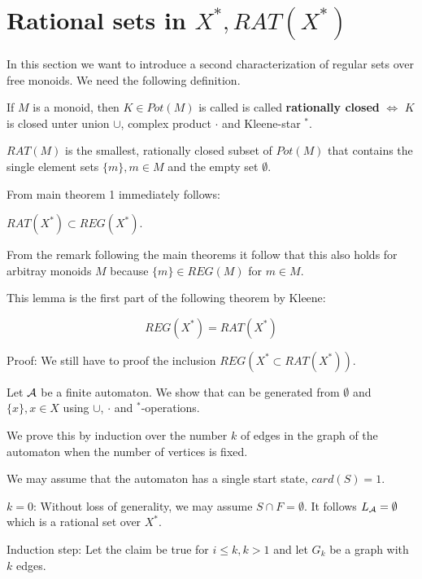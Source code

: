 \section{Rational sets in $X^*, RAT(X^*)$}

In this section we want to introduce a second characterization of regular sets
over free monoids. We need the following definition.

\begin{definition}
If $M$ is a monoid, then $K \in Pot(M)$ is called is called {\bf rationally
closed} $\Leftrightarrow$ $K$ is closed unter union $\cup$, complex product $\cdot$ and Kleene-star $^*$.
\end{definition}

\begin{definition}
$RAT(M)$ is the smallest, rationally closed subset of $Pot(M)$ that contains the
single element sets $\{m\}, m \in M$ and the empty set $\emptyset$.
\end{definition}

From main theorem 1 immediately follows:

\begin{lemma}
$RAT(X^*) \subset REG(X^*)$.
\end{lemma}

From the remark following the main theorems it follow that this also holds for
arbitray monoids $M$ because $\{m\} \in REG(M)$ for $m \in M$.

This lemma is the first part of the following theorem by Kleene:

\begin{theorem}[Kleene]
\[ REG(X^*) = RAT(X^*) \]
\end{theorem}

Proof: We still have to proof the inclusion $REG(X^* \subset RAT(X^*))$.

Let $\mbox{$\mathcal{A}$}$ be a finite automaton. We show that  can be generated
from $\emptyset$ and $\{x\}, x \in X$	using $\cup$, $\cdot$ and $^*$-operations.

We prove this by induction over the number $k$ of edges in the graph of the
automaton when the number of vertices is fixed.

We may assume that the automaton has a single start state, $card(S) = 1$.

$k = 0$: Without loss of generality, we may assume $S \cap F = \emptyset$. It
follows $\mbox{$L_{\mathcal{A}}$} = \emptyset$ which is a rational set over $X^*$.

Induction step: Let the claim be true for $i \leq k, k > 1$ and let $G_k$ be a
graph with $k$ edges.

